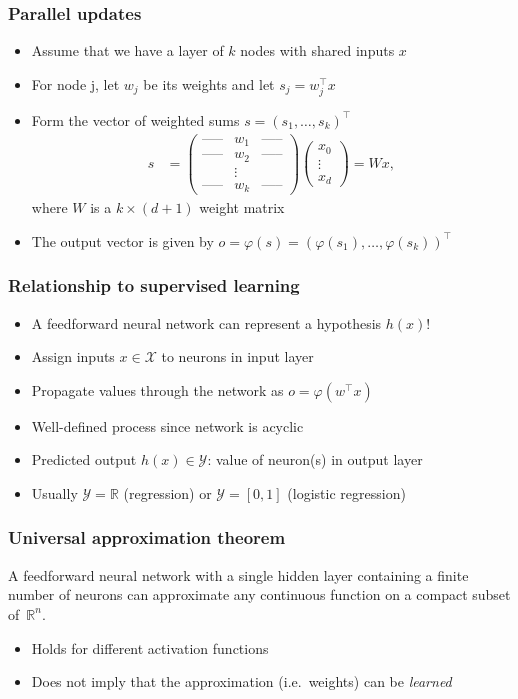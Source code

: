 \documentclass[10pt]{beamer}
\begin{document}
\begin{frame}
  \frametitle{Parallel updates}
  \begin{itemize}
	\item Assume that we have a layer of $k$ nodes with shared inputs $x$
	\item For node j, let $w_j$ be its weights and let $s_j=w_j^\top x$
	\item Form the vector of weighted sums $s = (s_1,\ldots,s_k)^\top$
  \begin{align*}
  s &= \left( \begin{array}{ccc} \textrm{-----} & w_1 & \textrm{-----} \\ \textrm{-----} & w_2 & \textrm{-----} \\ & \vdots & \\ \textrm{-----} & w_k & \textrm{-----} \end{array} \right)
  \left( \begin{array}{c} x_0 \\ \vdots \\ x_d \end{array} \right) = W x,
  \end{align*}
	where $W$ is a $k \times (d+1)$ weight matrix
	\item The output vector is given by $o = \varphi(s) = (\varphi(s_1),\ldots,\varphi(s_k))^\top$
  \end{itemize}
\end{frame}

\begin{frame}
  \frametitle{Relationship to supervised learning}
  \begin{itemize}
	\item A feedforward neural network can represent a hypothesis $h(x)$!
	\item Assign inputs $x\in\mathcal{X}$ to neurons in input layer
	\item Propagate values through the network as $o=\varphi(w^\top x)$
	\item Well-defined process since network is acyclic
	\item Predicted output $h(x)\in \mathcal{Y}$: value of neuron(s) in output layer
	\item Usually $\mathcal{Y}=\mathbb{R}$ (regression) or $\mathcal{Y}=[0,1]$ (logistic regression)
  \end{itemize}
\end{frame}

\begin{frame}
\frametitle{Universal approximation theorem}
	\begin{theorem}
	A feedforward neural network with a single hidden layer containing a finite number of neurons can approximate any continuous function on a compact subset of $\,\mathbb{R}^n$.
	\end{theorem}
\begin{itemize}
\item Holds for different activation functions
\item Does not imply that the approximation (i.e.~weights) can be {\em learned}
\end{itemize}
\end{frame}
\end{document}
